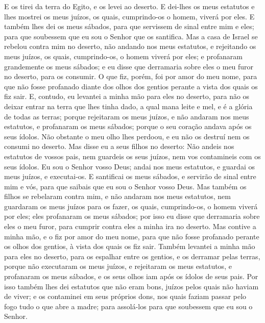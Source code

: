 E os tirei da terra do Egito, e os levei ao deserto. E
dei-lhes os meus estatutos e lhes mostrei os meus juízos, os quais,
cumprindo-os o homem, viverá por eles. E também lhes dei os
meus sábados, para que servissem de sinal entre mim e eles; para que
soubessem que eu sou o Senhor que os santifica. Mas a casa de
Israel se rebelou contra mim no deserto, não andando nos meus
estatutos, e rejeitando os meus juízos, os quais, cumprindo-os, o
homem viverá por eles; e profanaram grandemente os meus sábados; e
eu disse que derramaria sobre eles o meu furor no deserto, para os
consumir. O que fiz, porém, foi por amor do meu nome, para
que não fosse profanado diante dos olhos dos gentios perante a vista
dos quais os fiz sair. E, contudo, eu levantei a minha mão
para eles no deserto, para não os deixar entrar na terra que lhes
tinha dado, a qual mana leite e mel, e é a glória de todas as
terras; porque rejeitaram os meus juízos, e não andaram nos
meus estatutos, e profanaram os meus sábados; porque o seu coração
andava após os seus ídolos. Não obstante o meu olho lhes
perdoou, e eu não os destruí nem os consumi no deserto. Mas
disse eu a seus filhos no deserto: Não andeis nos estatutos de
vossos pais, nem guardeis os seus juízos, nem vos contamineis com os
seus ídolos. Eu sou o Senhor vosso Deus; andai nos meus
estatutos, e guardai os meus juízos, e executai-os. E
santificai os meus sábados, e servirão de sinal entre mim e vós,
para que saibais que eu sou o Senhor vosso Deus. Mas também
os filhos se rebelaram contra mim, e não andaram nos meus estatutos,
nem guardaram os meus juízos para os fazer, os quais, cumprindo-os,
o homem viverá por eles; eles profanaram os meus sábados; por isso
eu disse que derramaria sobre eles o meu furor, para cumprir contra
eles a minha ira no deserto. Mas contive a minha mão, e o fiz
por amor do meu nome, para que não fosse profanado perante os olhos
dos gentios, à vista dos quais os fiz sair. Também levantei a
minha mão para eles no deserto, para os espalhar entre os gentios, e
os derramar pelas terras, porque não executaram os meus
juízos, e rejeitaram os meus estatutos, e profanaram os meus
sábados, e os seus olhos iam após os ídolos de seus pais. Por
isso também lhes dei estatutos que não eram bons, juízos pelos quais
não haviam de viver; e os contaminei em seus próprios dons,
nos quais faziam passar pelo fogo tudo o que abre a madre; para
assolá-los para que soubessem que eu sou o Senhor.

